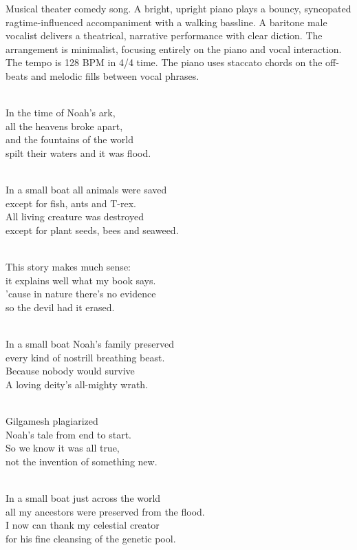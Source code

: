 

\begin{notes}
\end{notes}
\begin{style}
Musical theater comedy song. %
A bright, upright piano plays a bouncy, syncopated ragtime-influenced accompaniment with a walking bassline. %
A baritone male vocalist delivers a theatrical, narrative performance with clear diction. %
The arrangement is minimalist, focusing entirely on the piano and vocal interaction. %
The tempo is 128 BPM in 4/4 time. %
The piano uses staccato chords on the off-beats and melodic fills between vocal phrases.
\end{style}
\begin{lyrics}

\\
In the time of Noah's ark,\\
all the heavens broke apart,\\
and the fountains of the world\\
spilt their waters and it was flood.

\\
In a small boat all animals were saved\\
except for fish, ants and T-rex.\\
All living creature was destroyed\\
except for plant seeds, bees and seaweed.

\\
This story makes much sense:\\
it explains well what my book says.\\
’cause in nature there’s no evidence\\
so the devil had it erased.

\\
In a small boat Noah’s family preserved\\
every kind of nostrill breathing beast.\\
Because nobody would survive\\
A loving deity's all-mighty wrath.

\\
Gilgamesh plagiarized\\
Noah's tale from end to start.\\
So we know it was all true,\\
not the invention of something new.

\\
In a small boat just across the world\\
all my ancestors were preserved from the flood.\\
I now can thank my celestial creator\\
for his fine cleansing of the genetic pool.
\end{lyrics}

